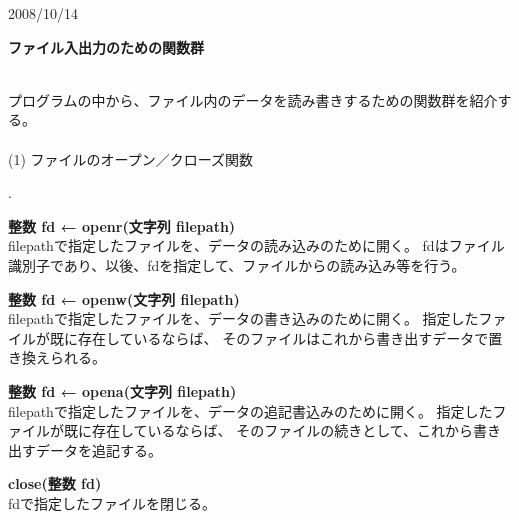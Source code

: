 \documentclass[10pt,a4j]{jarticle}
\newcounter{enum2}
\newenvironment{enumerate2}{%
   \begin{list}%
   {%
      \arabic{enum2}.\ \,%
   }%
   {%
      \usecounter{enum2}
      \setlength{\itemindent}{0zw}%
      \setlength{\leftmargin}{3zw}%
      \setlength{\rightmargin}{0zw}%
      \setlength{\labelsep}{0zw}%
      \setlength{\labelwidth}{3zw}%
      \setlength{\itemsep}{0em}%
      \setlength{\parsep}{0em}%
      \setlength{\listparindent}{0zw}%
   }
}{%
   \end{list}%
}
\begin{document}
\noindent
\begin{flushright}
{\small	2008/10/14}
\end{flushright}
\begin{center}
\begin{LARGE}
{\bf{ファイル入出力のための関数群\\
\ \\}}
\end{LARGE}
\end{center}

  プログラムの中から、ファイル内のデータを読み書きするための関数群を紹介する。\\
\ \\
(1) ファイルのオープン／クローズ関数 
\begin{enumerate2}
\item {\bf{整数 fd ← openr(文字列 filepath)}} \\
	filepathで指定したファイルを、データの読み込みのために開く。
	fdはファイル識別子であり、以後、fdを指定して、ファイルからの読み込み等を行う。

\item {\bf{整数 fd ← openw(文字列 filepath)}} \\
	filepathで指定したファイルを、データの書き込みのために開く。
	指定したファイルが既に存在しているならば、
        そのファイルはこれから書き出すデータで置き換えられる。

\item {\bf{整数 fd ← opena(文字列 filepath)}} \\
	filepathで指定したファイルを、データの追記書込みのために開く。
	指定したファイルが既に存在しているならば、
        そのファイルの続きとして、これから書き出すデータを追記する。

\item {\bf{close(整数 fd)}} \\
	fdで指定したファイルを閉じる。
\end{enumerate2}
\end{document}

